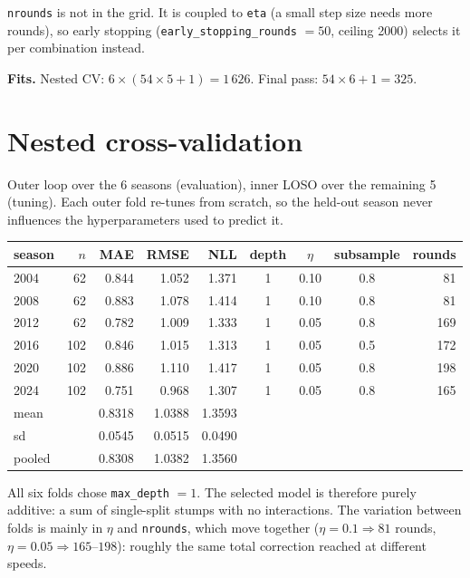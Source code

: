 \documentclass[11pt,a4paper]{article}
\begin{document}
\texttt{nrounds} is not in the grid. It is coupled to \texttt{eta}
(a small step size needs more rounds), so early stopping
(\texttt{early\_stopping\_rounds} $= 50$, ceiling 2000) selects it per
combination instead.

\textbf{Fits.} Nested CV: $6 \times (54 \times 5 + 1) = 1\,626$.
Final pass: $54 \times 6 + 1 = 325$.


\section{Nested cross-validation}

Outer loop over the 6 seasons (evaluation), inner LOSO over the
remaining 5 (tuning). Each outer fold re-tunes from scratch, so the
held-out season never influences the hyperparameters used to predict it.

\begin{center}
\begin{tabular}{lrrrrcccr}
  \toprule
  season & $n$ & MAE & RMSE & NLL & depth & $\eta$ & subsample & rounds \\
  \midrule
  2004 &  62 & 0.844 & 1.052 & 1.371 & 1 & 0.10 & 0.8 &  81 \\
  2008 &  62 & 0.883 & 1.078 & 1.414 & 1 & 0.10 & 0.8 &  81 \\
  2012 &  62 & 0.782 & 1.009 & 1.333 & 1 & 0.05 & 0.8 & 169 \\
  2016 & 102 & 0.846 & 1.015 & 1.313 & 1 & 0.05 & 0.5 & 172 \\
  2020 & 102 & 0.886 & 1.110 & 1.417 & 1 & 0.05 & 0.8 & 198 \\
  2024 & 102 & 0.751 & 0.968 & 1.307 & 1 & 0.05 & 0.8 & 165 \\
  \midrule
  mean &     & 0.8318 & 1.0388 & 1.3593 & & & & \\
  sd   &     & 0.0545 & 0.0515 & 0.0490 & & & & \\
  pooled &   & 0.8308 & 1.0382 & 1.3560 & & & & \\
  \bottomrule
\end{tabular}
\end{center}

All six folds chose \texttt{max\_depth} $= 1$. The selected model is
therefore purely additive: a sum of single-split stumps with no
interactions. The variation between folds is mainly in
$\eta$ and \texttt{nrounds}, which move together
($\eta = 0.1 \Rightarrow 81$ rounds, $\eta = 0.05 \Rightarrow 165$--$198$):
roughly the same total correction reached at different speeds.
\end{document}
